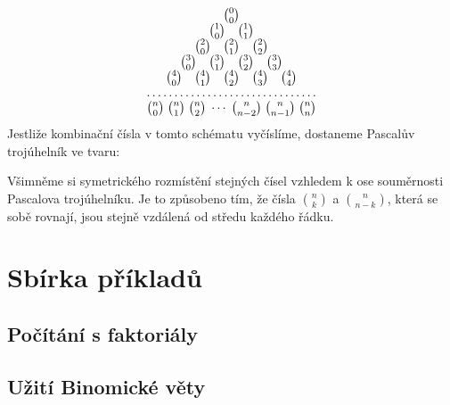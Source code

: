    \begin{align*}
      \begin{array}{c} 
        \binom{0}{0}                                                                          \\
        \binom{1}{0}\quad \binom{1}{1}                                                        \\  
        \binom{2}{0}\quad \binom{2}{1}\quad \binom{2}{2}                                      \\ 
        \binom{3}{0}\quad \binom{3}{1}\quad \binom{3}{2}\quad \binom{3}{3}                    \\ 
        \binom{4}{0}\quad \binom{4}{1}\quad \binom{4}{2}\quad \binom{4}{3}\quad  \binom{4}{4} \\ 
        \hdotsfor{1}                                                                          \\
        \binom{n}{0}\; \binom{n}{1}\; \binom{n}{2}\; \cdots\; 
        \binom{n}{n-2}\; \binom{n}{n-1}\; \binom{n}{n}                                        \\ 
      \end{array}
    \end{align*} Jestliže kombinační čísla v tomto schématu vyčíslíme, dostaneme Pascalův
    trojúhelník ve tvaru:

    Všimněme si symetrického rozmístění stejných čísel vzhledem k ose souměrnosti Pascalova
    trojúhelníku. Je to způsobeno tím, že čísla \(\binom{n}{k}\) a \(\binom{n}{n-k}\), která se sobě
    rovnají, jsou stejně vzdálená od středu každého řádku.
  
  \section{Sbírka příkladů}\label{mai:IchapIVcsecX}
    \subsection{Počítání s faktoriály}\label{mai:IchapIVcsecXssecI}
      
    \subsection{Užití Binomické věty}\label{mai:IchapIVcsecXssecII}
      
